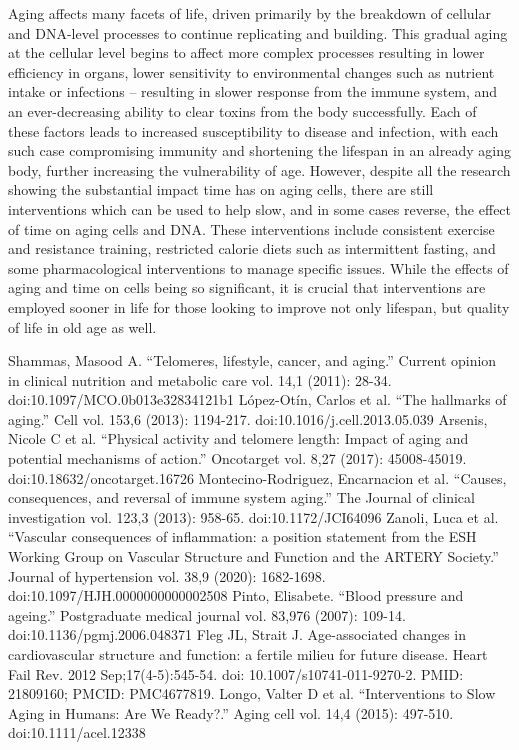 \documentclass{article}
\begin{document}
Aging affects many facets of life, driven primarily by the breakdown of cellular and DNA-level processes to continue replicating and building. This gradual aging at the cellular level begins to affect more complex processes resulting in lower efficiency in organs, lower sensitivity to environmental changes such as nutrient intake or infections -- resulting in slower response from the immune system, and an ever-decreasing ability to clear toxins from the body successfully. Each of these factors leads to increased susceptibility to disease and infection, with each such case compromising immunity and shortening the lifespan in an already aging body, further increasing the vulnerability of age. However, despite all the research showing the substantial impact time has on aging cells, there are still interventions which can be used to help slow, and in some cases reverse, the effect of time on aging cells and DNA. These interventions include consistent exercise and resistance training, restricted calorie diets such as intermittent fasting, and some pharmacological interventions to manage specific issues. While the effects of aging and time on cells being so significant, it is crucial that interventions are employed sooner in life for those looking to improve not only lifespan, but quality of life in old age as well.


\newpage
\begin{thebibliography}{10}
     Shammas, Masood A. “Telomeres, lifestyle, cancer, and aging.” Current opinion in clinical nutrition and metabolic care vol. 14,1 (2011): 28-34. doi:10.1097/MCO.0b013e32834121b1
    López-Otín, Carlos et al. “The hallmarks of aging.” Cell vol. 153,6 (2013): 1194-217. doi:10.1016/j.cell.2013.05.039
    Arsenis, Nicole C et al. “Physical activity and telomere length: Impact of aging and potential mechanisms of action.” Oncotarget vol. 8,27 (2017): 45008-45019. doi:10.18632/oncotarget.16726
    Montecino-Rodriguez, Encarnacion et al. “Causes, consequences, and reversal of immune system aging.” The Journal of clinical investigation vol. 123,3 (2013): 958-65. doi:10.1172/JCI64096
    Zanoli, Luca et al. “Vascular consequences of inflammation: a position statement from the ESH Working Group on Vascular Structure and Function and the ARTERY Society.” Journal of hypertension vol. 38,9 (2020): 1682-1698. doi:10.1097/HJH.0000000000002508
    Pinto, Elisabete. “Blood pressure and ageing.” Postgraduate medical journal vol. 83,976 (2007): 109-14. doi:10.1136/pgmj.2006.048371
    Fleg JL, Strait J. Age-associated changes in cardiovascular structure and function: a fertile milieu for future disease. Heart Fail Rev. 2012 Sep;17(4-5):545-54. doi: 10.1007/s10741-011-9270-2. PMID: 21809160; PMCID: PMC4677819.
    Longo, Valter D et al. “Interventions to Slow Aging in Humans: Are We Ready?.” Aging cell vol. 14,4 (2015): 497-510. doi:10.1111/acel.12338
\end{thebibliography}

    
\end{document}
